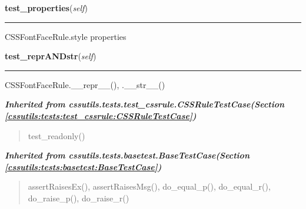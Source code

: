     \vspace{0.5ex}

\hspace{.8\funcindent}\begin{boxedminipage}{\funcwidth}

    \raggedright \textbf{test\_properties}(\textit{self})

    \vspace{-1.5ex}

    \rule{\textwidth}{0.5\fboxrule}
\setlength{\parskip}{2ex}
    CSSFontFaceRule.style properties

\setlength{\parskip}{1ex}
    \end{boxedminipage}

    \label{cssutils:tests:test_cssfontfacerule:CSSFontFaceRuleTestCase:test_reprANDstr}

    \vspace{0.5ex}

\hspace{.8\funcindent}\begin{boxedminipage}{\funcwidth}

    \raggedright \textbf{test\_reprANDstr}(\textit{self})

    \vspace{-1.5ex}

    \rule{\textwidth}{0.5\fboxrule}
\setlength{\parskip}{2ex}
    CSSFontFaceRule.\_\_repr\_\_(), .\_\_str\_\_()

\setlength{\parskip}{1ex}
    \end{boxedminipage}


\large{\textbf{\textit{Inherited from cssutils.tests.test\_cssrule.CSSRuleTestCase\textit{(Section \ref{cssutils:tests:test_cssrule:CSSRuleTestCase})}}}}

\begin{quote}
test\_readonly()
\end{quote}

\large{\textbf{\textit{Inherited from cssutils.tests.basetest.BaseTestCase\textit{(Section \ref{cssutils:tests:basetest:BaseTestCase})}}}}

\begin{quote}
assertRaisesEx(), assertRaisesMsg(), do\_equal\_p(), do\_equal\_r(), do\_raise\_p(), do\_raise\_r()
\end{quote}

